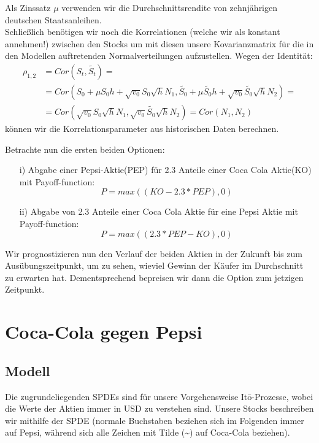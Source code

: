 \documentclass[12pt]{article}
\begin{document}
Als Zinssatz $\mu$ verwenden wir die Durchschnittsrendite von zehnjährigen deutschen Staatsanleihen.\\
Schließlich benötigen wir noch die Korrelationen (welche wir als konstant annehmen!) zwischen den Stocks um mit diesen unsere Kovarianzmatrix für die in den Modellen auftretenden Normalverteilungen aufzustellen.
Wegen der Identität:
\begin{align*}
\rho_{1,2}&=Cor(S_t,\tilde{S_t})=\\
&=Cor(S_0+\mu S_0h+\sqrt{v_0}S_0\sqrt{h}N_1,\tilde{S_0}+\mu \tilde{S_0}h+\sqrt{v_0}\tilde{S_0}\sqrt{h}N_2)= \\
&=Cor(\sqrt{v_0}S_0\sqrt{h}N_1,\sqrt{v_0}\tilde{S_0}\sqrt{h}N_2)=Cor(N_1,N_2)
\end{align*}
können wir die Korrelationsparameter aus historischen Daten berechnen.


Betrachte nun die ersten beiden Optionen:
\begin{itemize}
	\item[i)] Abgabe einer Pepsi-Aktie(PEP) für 2.3 Anteile einer Coca Cola Aktie(KO) mit Payoff-function:
	\begin{equation*}
	P=max((KO-2.3*PEP),0)
	\end{equation*}			
	\item[ii)] Abgabe von 2.3 Anteile einer Coca Cola Aktie für eine Pepsi Aktie mit Payoff-function:
	\begin{equation*}
	P=max((2.3*PEP-KO),0)
	\end{equation*}			
\end{itemize}

Wir prognostizieren nun den Verlauf der beiden Aktien in der Zukunft bis zum Ausübungszeitpunkt, um zu sehen, wieviel Gewinn der Käufer im Durchschnitt zu erwarten hat. Dementsprechend bepreisen wir dann die Option zum jetzigen Zeitpunkt.


\section{Coca-Cola gegen Pepsi}

\subsection{Modell}

Die zugrundeliegenden SPDEs sind für unsere Vorgehensweise It\={o}-Prozesse, wobei die Werte der Aktien immer in USD zu verstehen sind. Unsere Stocks beschreiben wir mithilfe der SPDE (normale Buchstaben beziehen sich im Folgenden immer auf Pepsi, während sich alle Zeichen mit Tilde (\~{}) auf Coca-Cola beziehen).
\end{document}
